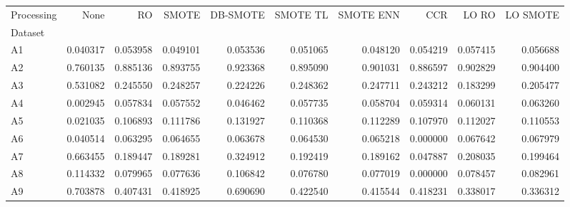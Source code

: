 \begin{tabular}{lrrrrrrrrr}
\toprule
Processing &      None &        RO &     SMOTE &  DB-SMOTE &  SMOTE TL &  SMOTE ENN &       CCR &     LO RO &  LO SMOTE \\
Dataset &           &           &           &           &           &            &           &           &           \\
\midrule
A1      &  0.040317 &  0.053958 &  0.049101 &  0.053536 &  0.051065 &   0.048120 &  0.054219 &  0.057415 &  0.056688 \\
A2      &  0.760135 &  0.885136 &  0.893755 &  0.923368 &  0.895090 &   0.901031 &  0.886597 &  0.902829 &  0.904400 \\
A3      &  0.531082 &  0.245550 &  0.248257 &  0.224226 &  0.248362 &   0.247711 &  0.243212 &  0.183299 &  0.205477 \\
A4      &  0.002945 &  0.057834 &  0.057552 &  0.046462 &  0.057735 &   0.058704 &  0.059314 &  0.060131 &  0.063260 \\
A5      &  0.021035 &  0.106893 &  0.111786 &  0.131927 &  0.110368 &   0.112289 &  0.107970 &  0.112027 &  0.110553 \\
A6      &  0.040514 &  0.063295 &  0.064655 &  0.063678 &  0.064530 &   0.065218 &  0.000000 &  0.067642 &  0.067979 \\
A7      &  0.663455 &  0.189447 &  0.189281 &  0.324912 &  0.192419 &   0.189162 &  0.047887 &  0.208035 &  0.199464 \\
A8      &  0.114332 &  0.079965 &  0.077636 &  0.106842 &  0.076780 &   0.077019 &  0.000000 &  0.078457 &  0.082961 \\
A9      &  0.703878 &  0.407431 &  0.418925 &  0.690690 &  0.422540 &   0.415544 &  0.418231 &  0.338017 &  0.336312 \\
\bottomrule
\end{tabular}
